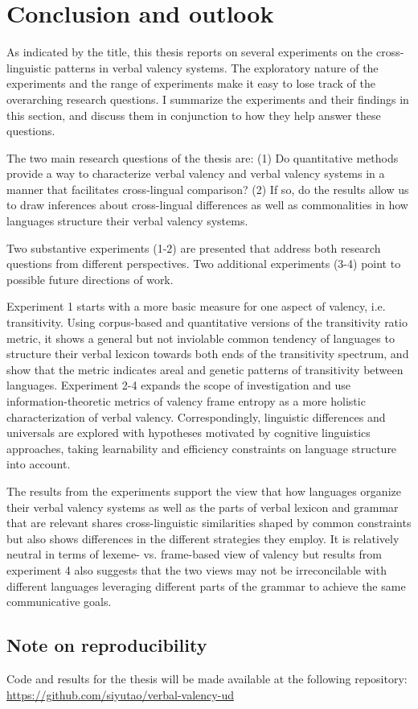 \chapter{Conclusion and outlook}\label{chapter:conclusion}

As indicated by the title, this thesis reports on several experiments on the cross-linguistic patterns in verbal valency systems. The exploratory nature of the experiments and the range of experiments make it easy to lose track of the overarching research questions. I summarize the experiments and their findings in this section, and discuss them in conjunction to how they help answer these questions. 

The two main research questions of the thesis are: (1) Do quantitative methods provide a way to characterize verbal valency and verbal valency systems in a manner that facilitates cross-lingual comparison? (2) If so, do the results allow us to draw inferences about cross-lingual differences as well as commonalities in how languages structure their verbal valency systems.

Two substantive experiments (1-2) are presented that address both research questions from different perspectives. Two additional experiments (3-4) point to possible future directions of work. 

Experiment 1 starts with a more basic measure for one aspect of valency, i.e. transitivity. Using corpus-based and quantitative versions of the transitivity ratio metric, it shows a general but not inviolable common tendency of languages to structure their verbal lexicon towards both ends of the transitivity spectrum, and show that the metric indicates areal and genetic patterns of transitivity between languages. Experiment 2-4 expands the scope of investigation and use information-theoretic metrics of valency frame entropy as a more holistic characterization of verbal valency. Correspondingly, linguistic differences and universals are explored with hypotheses motivated by cognitive linguistics approaches, taking learnability and efficiency constraints on language structure into account.

The results from the experiments support the view that how languages organize their verbal valency systems as well as the parts of verbal lexicon and grammar that are relevant shares cross-linguistic similarities shaped by common constraints but also shows differences in the different strategies they employ. It is relatively neutral in terms of lexeme- vs. frame-based view of valency but results from experiment 4 also suggests that the two views may not be irreconcilable with different languages leveraging different parts of the grammar to achieve the same communicative goals.

\section{Note on reproducibility}
Code and results for the thesis will be made available at the following repository: \url{https://github.com/siyutao/verbal-valency-ud}
